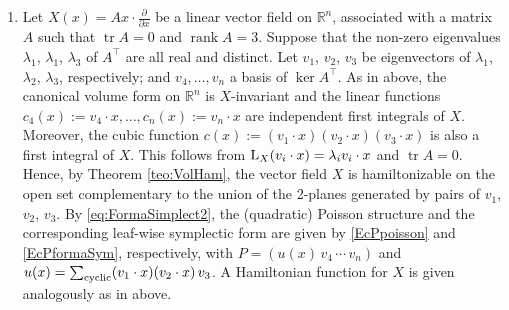 \documentclass[pdftex]{sigma}%
\newcommand{\R}[1]{\mathbb{R}^{#1}}
\numberwithin{equation}{section}
\begin{document}
\begin{Example}
\begin{enumerate}
 \item Let $X (x) = Ax \cdot \frac{\partial}{\partial x}$ be a linear vector field on $\R{n}$, associated with a matrix $A$ such that $\operatorname{tr}A = 0$ and $\operatorname{rank}A = 3$. Suppose that the non-zero eigenvalues $\lambda_{1}$, $\lambda_{1}$, $\lambda_{3}$ of $A^{\top}$ are all real and distinct. Let $v_1$, $v_2$, $v_3$ be eigenvectors of $\lambda_1$, $\lambda_2$, $\lambda_3$, respectively; and $v_4,\dots,v_{n}$ a basis of $\ker{A}^{\top}$. As in above, the canonical volume form on $\R{n}$ is $X$-invariant and the linear functions $c_4(x) := v_4 \cdot x, \dots, c_{n}(x) := v_{n} \cdot x$ are independent first integrals of $X$. Moreover, the cubic function $c(x):=(v_1\cdot x)(v_2\cdot x)(v_3\cdot x)$ is also a first integral of $X$. This follows from ${\rm L}_{X}(v_i\cdot x) = \lambda_i v_i\cdot x$ and $\operatorname{tr}A = 0$. Hence, by Theorem \ref{teo:VolHam}, the vector field $X$ is hamiltonizable on the open set complementary to the union of the 2-planes generated by pairs of $v_1$, $v_2$, $v_3$. By \eqref{eq:FormaSimplect2}, the (quadratic) Poisson structure and the corresponding leaf-wise symplectic form are given by \eqref{EcPpoisson} and \eqref{EcPformaSym}, respectively, with $P = (u(x) \, v_{4} \,\cdots\, v_{n})$ and $u(x) = \sum_{{\rm cyclic}} (v_1 \cdot x)(v_2 \cdot x)\,v_3$. A Hamiltonian function for $X$ is given analogously as in above.


\end{enumerate}
\end{Example}
\end{document}
